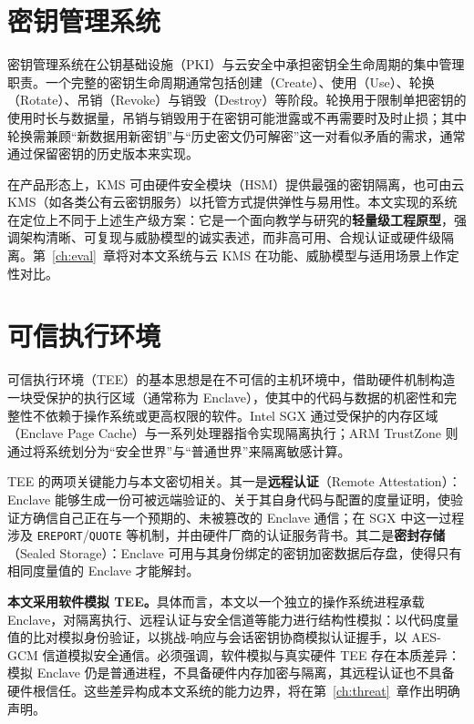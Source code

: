 \section{密钥管理系统}
\label{sec:kms}

密钥管理系统在公钥基础设施（PKI）与云安全中承担密钥全生命周期的集中管理职责。一个完整的密钥生命周期通常包括创建（Create）、使用（Use）、轮换（Rotate）、吊销（Revoke）与销毁（Destroy）等阶段\cite{nist80057}。轮换用于限制单把密钥的使用时长与数据量，吊销与销毁用于在密钥可能泄露或不再需要时及时止损；其中轮换需兼顾“新数据用新密钥”与“历史密文仍可解密”这一对看似矛盾的需求，通常通过保留密钥的历史版本来实现。

在产品形态上，KMS 可由硬件安全模块（HSM）提供最强的密钥隔离，也可由云 KMS（如各类公有云密钥服务）以托管方式提供弹性与易用性。本文实现的系统在定位上不同于上述生产级方案：它是一个面向教学与研究的\textbf{轻量级工程原型}，强调架构清晰、可复现与威胁模型的诚实表述，而非高可用、合规认证或硬件级隔离。第~\ref{ch:eval}~章将对本文系统与云 KMS 在功能、威胁模型与适用场景上作定性对比。

\section{可信执行环境}
\label{sec:tee}

可信执行环境（TEE）的基本思想是在不可信的主机环境中，借助硬件机制构造一块受保护的执行区域（通常称为 Enclave），使其中的代码与数据的机密性和完整性不依赖于操作系统或更高权限的软件\cite{sabt2015tee}。Intel SGX 通过受保护的内存区域（Enclave Page Cache）与一系列处理器指令实现隔离执行\cite{costan2016sgx, mckeen2013sgx}；ARM TrustZone 则通过将系统划分为“安全世界”与“普通世界”来隔离敏感计算\cite{pinto2019trustzone}。

TEE 的两项关键能力与本文密切相关。其一是\textbf{远程认证}（Remote Attestation）：Enclave 能够生成一份可被远端验证的、关于其自身代码与配置的度量证明，使验证方确信自己正在与一个预期的、未被篡改的 Enclave 通信；在 SGX 中这一过程涉及 \texttt{EREPORT}/\texttt{QUOTE} 等机制，并由硬件厂商的认证服务背书\cite{anati2013attestation}。其二是\textbf{密封存储}（Sealed Storage）：Enclave 可用与其身份绑定的密钥加密数据后存盘，使得只有相同度量值的 Enclave 才能解封。

\textbf{本文采用软件模拟 TEE。}具体而言，本文以一个独立的操作系统进程承载 Enclave，对隔离执行、远程认证与安全信道等能力进行结构性模拟：以代码度量值的比对模拟身份验证，以挑战-响应与会话密钥协商模拟认证握手，以 AES-GCM 信道模拟安全通信。必须强调，软件模拟与真实硬件 TEE 存在本质差异：模拟 Enclave 仍是普通进程，不具备硬件内存加密与隔离，其远程认证也不具备硬件根信任。这些差异构成本文系统的能力边界，将在第~\ref{ch:threat}~章作出明确声明。

